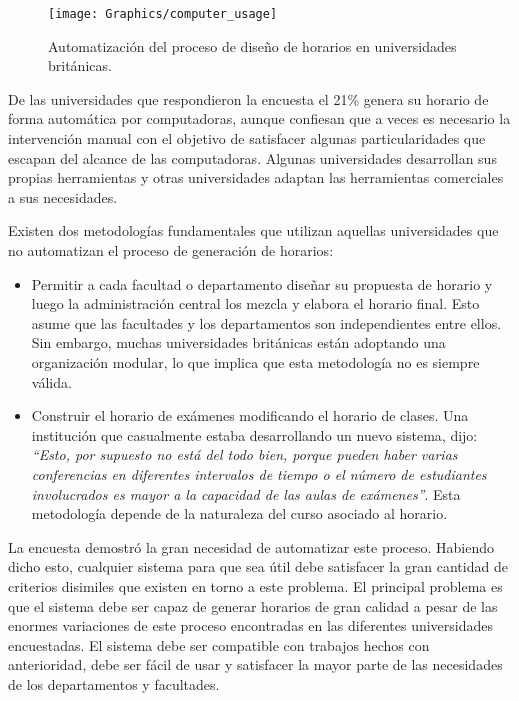 \begin{figure}
	\begin{center}
		\texttt{[image: Graphics/computer\_usage]}
		\caption{Automatización del proceso de diseño de horarios en universidades británicas.}
	\end{center}	
\end{figure}

De las universidades que respondieron la encuesta el 21\% genera su horario de forma automática por
computadoras, aunque confiesan que a veces es necesario la intervención manual con el objetivo de satisfacer
algunas particularidades que escapan del alcance de las computadoras. Algunas universidades desarrollan
sus propias herramientas y otras universidades adaptan las herramientas comerciales a sus necesidades.

Existen dos metodologías fundamentales que utilizan aquellas universidades que no automatizan el proceso de
generación de horarios:

\begin{itemize}
	\item Permitir a cada facultad o departamento diseñar su propuesta de horario y luego la administración
		central los mezcla y elabora el horario final. Esto asume que las facultades y los departamentos
		son independientes entre ellos. Sin embargo, muchas universidades británicas están adoptando una
		organización modular, lo que implica que esta metodología no es siempre válida.
	\item Construir el horario de exámenes modificando el horario de clases. Una institución que casualmente
		estaba desarrollando un nuevo sistema, dijo: \emph{``Esto, por supuesto no está del todo bien, porque
		pueden haber varias conferencias en diferentes intervalos de tiempo o el número de estudiantes involucrados
		es mayor a la capacidad de las aulas de exámenes''}. Esta metodología depende de la naturaleza del curso
		asociado al horario.
\end{itemize}

La encuesta demostró la gran necesidad de automatizar este proceso. Habiendo dicho esto, cualquier sistema
para que sea útil debe satisfacer la gran cantidad de criterios disimiles que existen en torno a este problema.
El principal problema es que el sistema debe ser capaz de generar horarios de gran calidad a pesar de las enormes
variaciones de este proceso encontradas en las diferentes universidades encuestadas. El sistema debe ser compatible
con trabajos hechos con anterioridad, debe ser fácil de usar y satisfacer la mayor parte de las necesidades de los departamentos y facultades.

